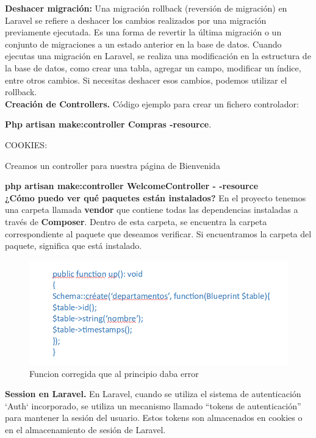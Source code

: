 \documentclass{article}
\begin{document}
\textbf{Deshacer migración:}
Una migración rollback (reversión de migración) en Laravel se refiere a deshacer los cambios realizados por una migración previamente ejecutada. Es una forma de revertir la última migración o un conjunto de migraciones a un estado anterior en la base de datos.
Cuando ejecutas una migración en Laravel, se realiza una modificación en la estructura de la base de datos, como crear una tabla, agregar un campo, modificar un índice, entre otros cambios. Si necesitas deshacer esos cambios, podemos utilizar el rollback.\\

\textbf{Creación de Controllers.}
Código ejemplo para crear un fichero controlador: 

\textbf{Php artisan make:controller Compras -resource}.

COOKIES:

Creamos un controller para nuestra página de Bienvenida

\textbf{php artisan make:controller WelcomeController - -resource}\\


\textbf{¿Cómo puedo ver qué paquetes están instalados?}
En el proyecto tenemos una carpeta llamada \textbf{vendor} que contiene todas las dependencias instaladas a través de \textbf{Composer}. Dentro de esta carpeta, se encuentra la carpeta correspondiente al paquete que deseamos verificar. Si encuentramos la carpeta del paquete, significa que está instalado.\\


\begin{figure}[!]
\centering
\includegraphics[width=12cm]{funciónCorrecciónError.png}
\caption{\label{fig:013} Funcion corregida que al principio daba error}
\end{figure}

\textbf{Session en Laravel.}
En Laravel, cuando se utiliza el sistema de autenticación `Auth` incorporado, se utiliza un mecanismo llamado ``tokens de autenticación'' para mantener la sesión del usuario. Estos tokens son almacenados en cookies o en el almacenamiento de sesión de Laravel.
\end{document}
